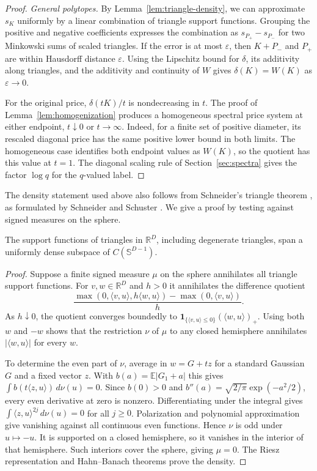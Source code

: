 \begin{proof}
\emph{General polytopes.}
By Lemma~\ref{lem:triangle-density}, we can approximate $s_K$
uniformly by a linear combination of triangle support functions.
Grouping the positive and negative coefficients expresses the combination
as $s_{P_+}-s_{P_-}$ for two Minkowski sums of scaled triangles. If the
error is at most
$\varepsilon$, then $K+P_-$ and $P_+$ are within Hausdorff distance
$\varepsilon$. Using the Lipschitz bound for $\delta$, its additivity
along triangles, and the additivity and continuity of $W$ gives
$\delta(K)=W(K)$ as $\varepsilon\to0$.

For the original price, $\delta(tK)/t$ is nondecreasing in $t$.
The proof of Lemma~\ref{lem:homogenization} produces a homogeneous
spectral price system at either endpoint, $t\downarrow0$ or
$t\to\infty$. Indeed, for a finite set of positive diameter, its
rescaled diagonal price has the same positive lower bound in both
limits. The homogeneous case identifies both endpoint values as
$W(K)$, so the quotient has this value at $t=1$. The diagonal scaling
rule of Section~\ref{sec:spectra} gives the factor $\log q$ for the
$q$-valued label.
\end{proof}

The density statement used above also follows from Schneider's triangle
theorem \cite{Schneider1996}, as formulated by Schneider and Schuster
\cite[pp.~2--3]{SS}. We give a proof by testing against signed measures
on the sphere.
\begin{lemma}
\label{lem:triangle-density}
The support functions of triangles in $\mathbb R^D$, including degenerate
triangles, span a uniformly dense subspace of $C(\mathbb S^{D-1})$.
\end{lemma}

\begin{proof}
Suppose a finite signed measure $\mu$ on the sphere annihilates all
triangle support functions. For $v,w\in\mathbb R^D$ and $h>0$ it
annihilates the difference quotient
\[
 \frac{\max(0,\langle v,u\rangle,h\langle w,u\rangle)
              -\max(0,\langle v,u\rangle)}{h}.
\]
As $h\downarrow0$, the quotient converges boundedly to
$\mathbf1_{\{\langle v,u\rangle\leq0\}}(\langle w,u\rangle)_+$.
Using both $w$ and $-w$ shows that the restriction $\nu$ of $\mu$
to any closed hemisphere annihilates $|\langle w,u\rangle|$ for
every $w$.

To determine the even part of $\nu$, average in $w=G+tz$ for a standard
Gaussian $G$ and a fixed vector $z$. With $b(a)=\mathbb E|G_1+a|$ this
gives $\int b(t\langle z,u\rangle)\,d\nu(u)=0$. Since $b(0)>0$ and
$b''(a)=\sqrt{2/\pi}\exp(-a^2/2)$, every even derivative at zero is
nonzero. Differentiating under the integral gives
$\int\langle z,u\rangle^{2j}\,d\nu(u)=0$ for all $j\ge0$.
Polarization and polynomial approximation give vanishing against all
continuous even functions. Hence $\nu$ is odd under $u\mapsto-u$.
It is supported on a closed hemisphere, so it vanishes in the interior
of that hemisphere. Such interiors cover the sphere, giving $\mu=0$.
The Riesz representation and Hahn--Banach theorems prove the density.
\end{proof}


